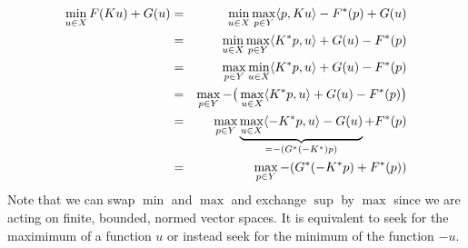         \begin{eqnarray}
            \min_{u \in X} F(Ku) + G(u) &=& \min_{u \in X} \max_{p \in Y} \langle p, Ku \rangle - F^{\ast}(p) + G(u) \notag \\
            &=& \min_{u \in X} \max_{p \in Y} \langle K^{\ast}p, u \rangle + G(u) - F^{\ast}(p) \notag \\
            &=& \max_{p \in Y} \min_{u \in X} \langle K^{\ast}p, u \rangle + G(u) - F^{\ast}(p) \notag \\
            &=& \max_{p \in Y} -\big(\max_{u \in X} \langle K^{\ast}p, u \rangle + G(u) - F^{\ast}(p)\big) \notag \\
            &=& \max_{p \in Y} \underbrace{\max_{u \in X} \langle -K^{\ast}p, u \rangle - G(u)}_{= -(G^{\ast}(-K^{\ast})p)} + F^{\ast}(p) \notag \\
            &=& \max_{p \in Y} -(G^{\ast}(-K^{\ast}p) + F^{\ast}(p))
            \label{eq:swap_min_to_max}
        \end{eqnarray}
    Note that we can swap $\min$ and $\max$ and exchange $\sup$ by $\max$ since we are acting on finite, bounded, normed vector spaces. It is equivalent to seek for the maximimum of a function $u$ or instead seek for the minimum of the function $-u$.




